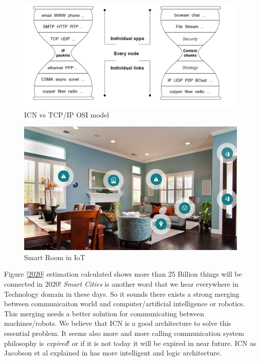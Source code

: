 \begin{figure}[H]

\begin{center}

\includegraphics[scale = 0.6]{Pictures/spec.png}

\caption{ICN vs TCP/IP OSI model} \label{spec} 

\end{center}

\end{figure}

\begin{figure}[H]

\begin{center}

\includegraphics[scale = 0.35]{Pictures/internetofthings.png}

\caption{Smart Room in IoT} \label{internetofthings} 

\end{center}

\end{figure}

Figure \ref{2020} estimation calculated shows more than 25 Billion things will be connected in 2020! \textit{Smart Cities} is another word that we hear everywhere in Technology domain in these days. So it sounds there exists a strong merging between communicaiton world and computer/artificial intelligence or robotics. This merging needs a better solution for communicating between machines/robots. We believe that ICN is a good architecture to solve this essential problem. It seems also more and more calling communication system philosophy is \textit{expired}! or if it is not today it will be expired in near future. ICN as Jacobson et al explained in \cite{jacobson} has more intelligent and logic architecture.


